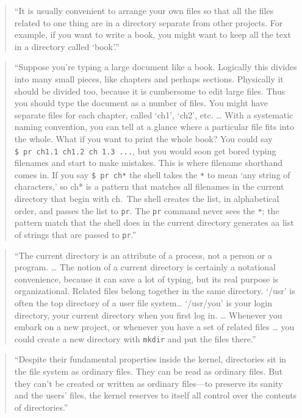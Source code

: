 \documentclass[]{tufte-book}
\begin{document}
\begin{quote}
``It is usually convenient to arrange your own files so that all the files related to one thing are in a
directory separate from other projects. For example, if you want to write a book, you might want to
keep all the text in a directory called `book'.'' \citep{kernighan1984unix}
\end{quote}

\begin{quote}
``Suppose you're typing a large document like a book. Logically this divides into many small pieces,
like chapters and perhaps sections. Physically it should be divided too, because it is cumbersome
to edit large files. Thus you should type the document as a number of files. You might have separate
files for each chapter, called `ch1', `ch2', etc. \ldots{} With a systematic naming convention, you can tell at
a glance where a particular file fits into the whole. What if you want to print the whole book? You could
say \texttt{\$\ pr\ ch1.1\ ch1.2\ ch\ 1.3\ ...}, but you would soon get bored typing filenames and start to make mistakes.
This is where filename shorthand comes in. If you say \texttt{\$\ pr\ ch*} the shell takes the \texttt{*} to mean `any
string of characters,' so ch* is a pattern that matches all filenames in the current directory that
begin with ch.~The shell creates the list, in alphabetical order, and passes the list to \texttt{pr}. The
\texttt{pr} command never sees the \texttt{*}; the pattern match that the shell does in the current directory
generates aa list of strings that are passed to \texttt{pr}.'' \citep{kernighan1984unix}
\end{quote}

\begin{quote}
``The current directory is an attribute of a process, not a person or a program. \ldots{} The notion of a
current directory is certainly a notational convenience, because it can save a lot of typing, but
its real purpose is organizational. Related files belong together in the same directory. `/usr' is
often the top directory of a user file system\ldots{} `/usr/you' is your login directory, your current
directory when you first log in. \ldots{} Whenever you embark on a new project, or whenever you have
a set of related files \ldots{} you could create a new directory with \texttt{mkdir} and put the files there.'' \citep{kernighan1984unix}
\end{quote}

\begin{quote}
``Despite their fundamental properties inside the kernel, directories sit in the file system as
ordinary files. They can be read as ordinary files. But they can't be created or written as
ordinary files---to preserve its sanity and the users' files, the kernel reserves to itself all
control over the contents of directories.'' \citep{kernighan1984unix}
\end{quote}
\end{document}
